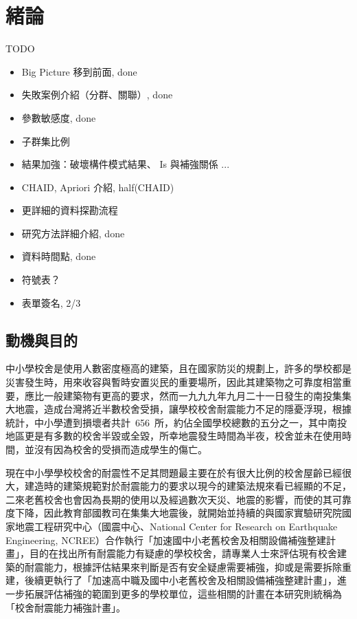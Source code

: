 % 
\chapter{緒論}
\label{cha:intro} 

TODO

\begin{itemize}
\item Big Picture 移到前面, done
\item 失敗案例介紹（分群、關聯）, done
\item 參數敏感度, done
\item 子群集比例
\item 結果加強：破壞構件模式結果、 Is 與補強關係 ...
\item CHAID, Apriori 介紹, half(CHAID)
\item 更詳細的資料探勘流程
\item 研究方法詳細介紹, done
\item 資料時間點, done
\item 符號表？
\item 表單簽名, 2/3
\end{itemize}

\section{動機與目的}

中小學校舍是使用人數密度極高的建築，且在國家防災的規劃上，許多的學校都是災害發生時，用來收容與暫時安置災民的重要場所，因此其建築物之可靠度相當重要，應比一般建築物有更高的要求，然而一九九九年九月二十一日發生的南投集集大地震，造成台灣將近半數校舍受損，讓學校校舍耐震能力不足的隱憂浮現，根據統計，中小學遭到損壞者共計~656~所，約佔全國學校總數的五分之一，其中南投地區更是有多數的校舍半毀或全毀，所幸地震發生時間為半夜，校舍並未在使用時間，並沒有因為校舍的受損而造成學生的傷亡。

現在中小學學校校舍的耐震性不足其問題最主要在於有很大比例的校舍屋齡已經很大，建造時的建築規範對於耐震能力的要求以現今的建築法規來看已經顯的不足，二來老舊校舍也會因為長期的使用以及經過數次天災、地震的影響，而使的其可靠度下降，因此教育部國教司在集集大地震後，就開始並持續的與國家實驗研究院國家地震工程研究中心（國震中心、National Center for Research on Earthquake Engineering, NCREE）合作執行「加速國中小老舊校舍及相關設備補強整建計畫」，目的在找出所有耐震能力有疑慮的學校校舍，請專業人士來評估現有校舍建築的耐震能力，根據評估結果來判斷是否有安全疑慮需要補強，抑或是需要拆除重建，後續更執行了「加速高中職及國中小老舊校舍及相關設備補強整建計畫」，進一步拓展評估補強的範圍到更多的學校單位，這些相關的計畫在本研究則統稱為「校舍耐震能力補強計畫」。

